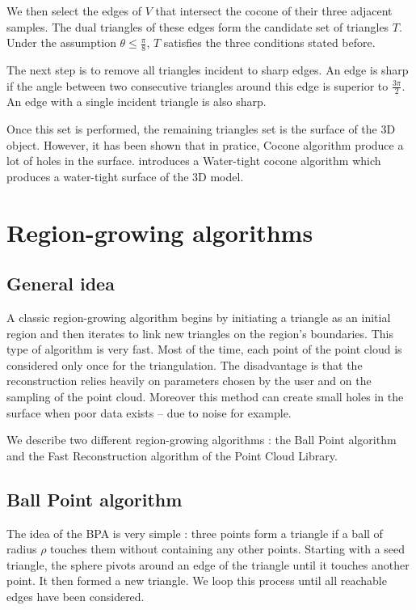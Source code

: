\documentclass[a4paper]{article}
\begin{document}
We then select the edges of $V$ that intersect the cocone of their three adjacent samples. The dual triangles of these edges form the candidate set of triangles $T$. Under the assumption $\theta\le\frac{\pi}{8}$, $T$ satisfies the three conditions stated before.

The next step is to remove all triangles incident to sharp edges. An edge is sharp if the angle between two consecutive triangles around this edge is superior to $\frac{3\pi}{2}$. An edge with a single incident triangle is also sharp.

Once this set is performed, the remaining triangles set is the surface of the 3D object. However, it has been shown that in pratice, Cocone algorithm produce a lot of holes in the surface. \cite{Tightcocone} introduces a Water-tight cocone algorithm which produces a water-tight surface of the 3D model.


\newpage

\section{Region-growing algorithms}
\subsection{General idea}
A classic region-growing algorithm begins by initiating a triangle as an initial region and then iterates to link new triangles on the region's boundaries. This type of algorithm is very fast. Most of the time, each point of the point cloud is considered only once for the triangulation. The disadvantage is that the reconstruction relies heavily on parameters chosen by the user and on the sampling of the point cloud. Moreover this method can create small holes in the surface when poor data  exists -- due to noise for example. 

We describe two different region-growing algorithms : the Ball Point algorithm and the Fast Reconstruction algorithm of the Point Cloud Library.

\subsection{Ball Point algorithm}
The idea of the BPA is very simple : three points form a triangle if a ball of radius $\rho$ touches them without containing any other points. Starting with a seed triangle, the sphere pivots around an edge of the triangle until it touches another point. It then formed a new triangle. We loop this process until all reachable edges have been considered.
\end{document}
